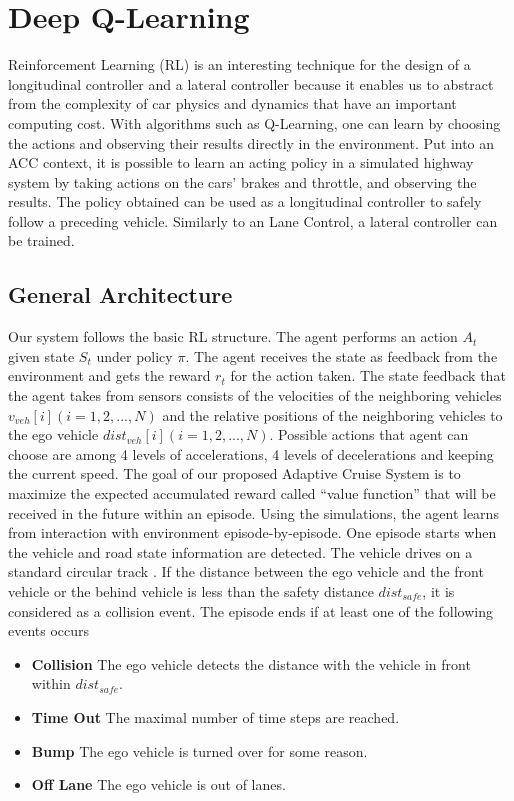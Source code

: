 \chapter{Deep Q-Learning}

Reinforcement Learning (RL) is an interesting technique for the design of a longitudinal controller and a lateral controller because it enables us to abstract from the complexity of car physics and dynamics that have an important computing cost. With algorithms such as Q-Learning, one can learn by choosing the actions and observing their results directly in the environment. Put into an ACC context, it is possible to learn an acting policy in a simulated highway system by taking actions on the cars' brakes and throttle, and observing the results. The policy obtained can be used as a longitudinal controller to safely follow a preceding vehicle. Similarly to an Lane Control, a lateral controller can be trained.

\section{General Architecture}

Our system follows the basic RL structure. The agent performs an action $A_t$ given state $S_t$ under policy $\pi$. The agent receives the state as feedback from the environment and gets the reward $r_t$ for the action taken. The state feedback that the agent takes from sensors consists of the velocities of the neighboring vehicles $v_{veh}[i] (i = 1, 2, ..., N)$ and the relative positions of the neighboring vehicles to the ego vehicle $dist_{veh}[i] (i = 1, 2, ..., N)$. Possible actions that agent can choose are among 4 levels of accelerations, 4 levels of decelerations and keeping the current speed. The goal of our proposed Adaptive Cruise System is to maximize the expected accumulated reward called ``value function'' that will be received in the future within an episode. Using the simulations, the agent learns from interaction with environment episode-by-episode. One episode starts when the vehicle and road state information are detected. The vehicle drives on a standard circular track . If the distance between the ego vehicle and the front vehicle or the behind vehicle is less than the safety distance $dist_{safe}$, it is considered as a collision event. The episode ends if at least one of the following events occurs

\begin{itemize}

\item \textbf{Collision} The ego vehicle detects the distance with the vehicle in front within $dist_{safe}$.

\item \textbf{Time Out} The maximal number of time steps are reached.

\item \textbf{Bump} The ego vehicle is turned over for some reason.

\item \textbf{Off Lane} The ego vehicle is out of lanes.

\end{itemize}

